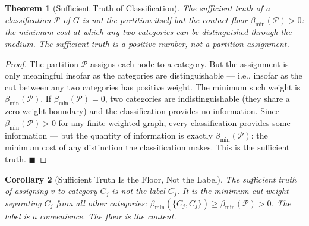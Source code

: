 \documentclass[11pt,twocolumn,a4paper]{article}
\theoremstyle{plain}
\newtheorem{theorem}{Theorem}[section]
\newtheorem{corollary}[theorem]{Corollary}
\theoremstyle{definition}
\theoremstyle{remark}
\newcommand{\Pcal}{\mathcal{P}}
\newcommand{\bmin}{\beta_{\min}}
\renewcommand{\qed}{\hfill$\blacksquare$}
\begin{document}
\begin{theorem}[Sufficient Truth of Classification]
\label{thm:classification_truth}
The sufficient truth of a classification $\Pcal$ of $G$ is not the partition
itself but the contact floor $\bmin(\Pcal) > 0$: the minimum cost at which
any two categories can be distinguished through the medium. The sufficient
truth is a positive number, not a partition assignment.
\end{theorem}

\begin{proof}
The partition $\Pcal$ assigns each node to a category. But the assignment
is only meaningful insofar as the categories are distinguishable --- i.e.,
insofar as the cut between any two categories has positive weight. The
minimum such weight is $\bmin(\Pcal)$. If $\bmin(\Pcal) = 0$, two categories
are indistinguishable (they share a zero-weight boundary) and the classification
provides no information. Since $\bmin(\Pcal) > 0$ for any finite weighted
graph, every classification provides some information --- but the quantity of
information is exactly $\bmin(\Pcal)$: the minimum cost of any distinction
the classification makes. This is the sufficient truth. \qed
\end{proof}

\begin{corollary}[Sufficient Truth Is the Floor, Not the Label]
\label{cor:sufficient_truth}
The sufficient truth of assigning $v$ to category $C_j$ is not the label
$C_j$. It is the minimum cut weight separating $C_j$ from all other
categories: $\bmin(\{C_j, \overline{C_j}\}) \geq \bmin(\Pcal) > 0$.
The label is a convenience. The floor is the content.
\end{corollary}
\end{document}
